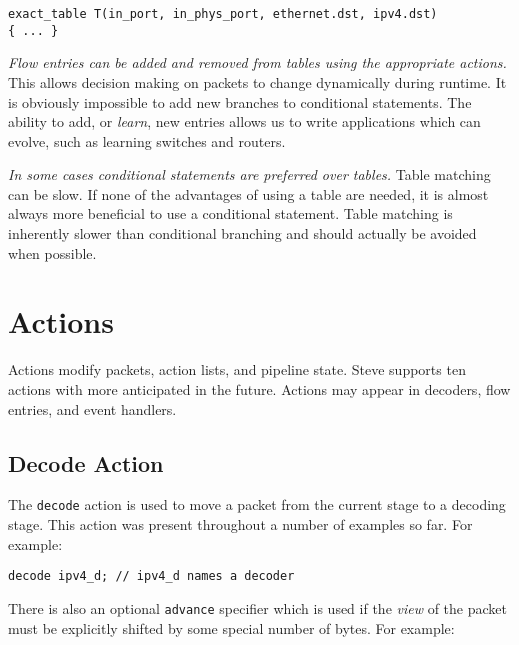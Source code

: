\begin{codepage}
\begin{lstlisting}
exact_table T(in_port, in_phys_port, ethernet.dst, ipv4.dst)
{ ... }
\end{lstlisting}
\end{codepage}

\textit{Flow entries can be added and removed from tables using the appropriate
actions.} This allows decision making on packets to change dynamically during
runtime. It is obviously impossible to add new branches to conditional
statements. The ability to add, or \textit{learn}, new entries allows us to
write applications which can evolve, such as learning switches and routers.

\textit{In some cases conditional statements are preferred over tables.} 
Table matching can be slow. If none of the advantages of using a table are 
needed, it is almost always more beneficial to use a conditional statement. Table 
matching is inherently slower than conditional branching and should actually be 
avoided when possible.

\section{Actions} \label{tut:action}

Actions modify packets, action lists, and pipeline state. Steve supports ten
actions with more anticipated in the future. Actions may appear in decoders,
flow entries, and event handlers.

\subsection{Decode Action} \label{tut:decode_action}

The \texttt{decode} action is used to move a packet from the current stage to a
decoding stage. This action was present throughout a number of examples so far.
For example:

\begin{codepage}
\begin{lstlisting}
decode ipv4_d; // ipv4_d names a decoder
\end{lstlisting}
\end{codepage}


There is also an optional \texttt{advance} specifier which is used if
the \textit{view} of the packet must be explicitly shifted by some special
number of bytes. For example:

